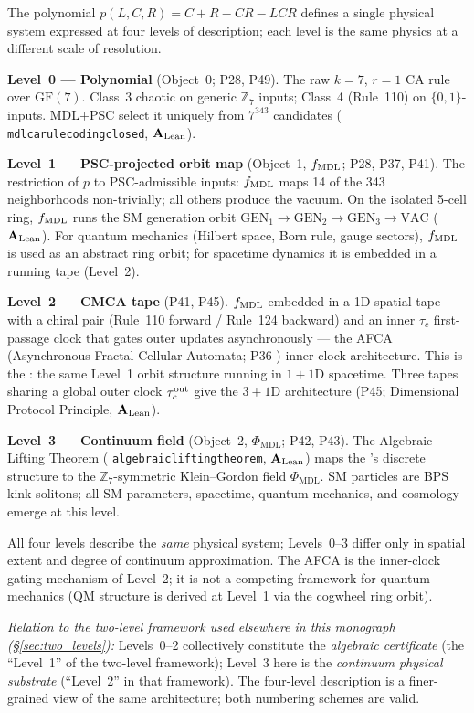 \documentclass[11pt,openany]{book}
\theoremstyle{remark}
\newcommand{\PHIMDL}{\Phi_{\mathrm{MDL}}}
\newcommand{\ZS}{\mathbb{Z}_7}
\newcommand{\lean}[1]{%
  \penalty-100
  \begingroup\def\_{\textunderscore\allowbreak}\texttt{#1}\endgroup}
\newcommand{\CMCA}{\text{CMCA}}
\newcommand{\CatAL}{\ensuremath{\textbf{A}_{\rm Lean}}}
\begin{document}
\begin{tcolorbox}[colback=blue!4,colframe=blue!50,
  title={The GTE Computational Architecture: One System, Four Levels},
  fonttitle=\bfseries,breakable]
\small
The polynomial $p(L,C,R) = C+R-CR-LCR$ defines a single physical system
expressed at four levels of description; each level is the same physics
at a different scale of resolution.

\medskip
\noindent\textbf{Level~0 --- Polynomial} (Object~0; P28, P49).
The raw $k{=}7$, $r{=}1$ CA rule over $\mathrm{GF}(7)$.
Class~3 chaotic on generic $\ZS$ inputs; Class~4 (Rule~110) on
$\{0,1\}$-inputs. MDL$+$PSC select it uniquely from $7^{343}$ candidates
(\lean{mdl\_ca\_rule\_coding\_closed}, \CatAL).

\medskip
\noindent\textbf{Level~1 --- PSC-projected orbit map} (Object~1, $f_{\rm MDL}$; P28, P37, P41).
The restriction of $p$ to PSC-admissible inputs: $f_{\rm MDL}$ maps 14 of the 343
neighborhoods non-trivially; all others produce the vacuum.
On the isolated 5-cell ring, $f_{\rm MDL}$ runs the SM generation orbit
$\mathrm{GEN}_1\to\mathrm{GEN}_2\to\mathrm{GEN}_3\to\mathrm{VAC}$ (\CatAL).
For quantum mechanics (Hilbert space, Born rule, gauge sectors), $f_{\rm MDL}$ is
used as an abstract ring orbit; for spacetime dynamics it is embedded in a
running tape (Level~2).

\medskip
\noindent\textbf{Level~2 --- CMCA tape} (P41, P45).
$f_{\rm MDL}$ embedded in a 1D spatial tape with a chiral pair
(Rule~110 forward / Rule~124 backward) and an inner $\tau_c$ first-passage clock that gates
outer updates asynchronously --- the AFCA (Asynchronous Fractal Cellular Automata;
P36 \cite{SpivackEmergentGravity}) inner-clock architecture.
This is the \CMCA: the same Level~1 orbit structure running in $1{+}1$D
spacetime. Three tapes sharing a global outer clock $\tau_c^{\rm out}$ give
the $3{+}1$D architecture (P45; Dimensional Protocol Principle, \CatAL).

\medskip
\noindent\textbf{Level~3 --- Continuum field} (Object~2, $\PHIMDL$; P42, P43).
The Algebraic Lifting Theorem (\lean{algebraic\_lifting\_theorem}, \CatAL) maps
the \CMCA's discrete structure to the $\ZS$-symmetric Klein--Gordon field $\PHIMDL$.
SM particles are BPS kink solitons; all SM parameters, spacetime, quantum
mechanics, and cosmology emerge at this level.

\medskip
\noindent All four levels describe the \emph{same} physical system; Levels~0--3
differ only in spatial extent and degree of continuum approximation.
The AFCA is the inner-clock gating mechanism of Level~2; it is not a
competing framework for quantum mechanics (QM structure is derived at Level~1
via the cogwheel ring orbit).

\medskip
\noindent\textit{Relation to the two-level framework used elsewhere in this
monograph (§\ref{sec:two_levels}):}
Levels~0--2 collectively constitute the \emph{algebraic certificate} (the
``Level~1'' of the two-level framework); Level~3 here is the \emph{continuum
physical substrate} (``Level~2'' in that framework). The four-level description
is a finer-grained view of the same architecture; both numbering schemes are
valid.
\end{tcolorbox}
\end{document}
